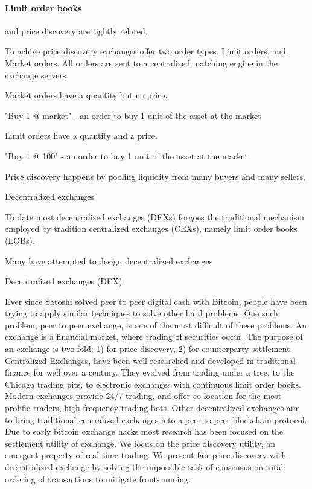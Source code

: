 \documentclass[12pt]{article}
\begin{document}
\paragraph*{Limit order books} and price discovery are tightly related. \citep{RePEc:nbr:nberwo:6257} \cite{RePEc:eee:jfinec:v:17:y:1986:i:1:p:5-26}

To achive price discovery exchanges offer two order types. Limit orders, and Market orders. All orders are sent to a centralized matching engine in the exchange servers. 


Market orders have a quantity but no price. 

\begin{enumerate*}
    \item "Buy 1 @ market" - an order to buy 1 unit of the asset at the market  
\end{enumerate*}

Limit orders have a quantity and a price. 

\begin{enumerate*}
    \item "Buy 1 @ 100" - an order to buy 1 unit of the asset at the market  
\end{enumerate*}



Price discovery happens by pooling liquidity from many buyers and many sellers. 

Decentralized exchanges 


To date most decentralized exchanges (DEXs) forgoes the traditional mechanism employed by tradition centralized exchanges (CEXs), namely limit order books (LOBs).  

Many have attempted to design decentralized exchanges 




Decentralized exchanges (DEX) 




    Ever  since  Satoshi  solved  peer  to  peer  digital  cash  with  Bitcoin,  people have  been  trying  to  apply  similar  techniques  to  solve  other  hard  problems. One such problem, peer to peer exchange, is one of the most difficult of these problems. An exchange is a financial market, where trading of securities occur. The purpose of an exchange is two fold;  1) for price discovery, 2) for counterparty settlement. Centralized Exchanges, have been well researched and developed in traditional finance for well over a century.  They evolved from trading under a tree, to the Chicago trading pits, to electronic exchanges with continuous limit order books. Modern exchanges provide 24/7 trading, and offer co-location for the most prolific traders, high frequency trading bots. Other decentralized exchanges aim to bring traditional centralized exchanges into a peer to peer blockchain protocol. Due to early bitcoin exchange hacks most research has been focused on the settlement utility of exchange. We focus on the price discovery utility, an emergent property of real-time trading. We present fair price discovery with decentralized exchange by solving the impossible task of consensus on total ordering of transactions to mitigate front-running.
\end{document}
